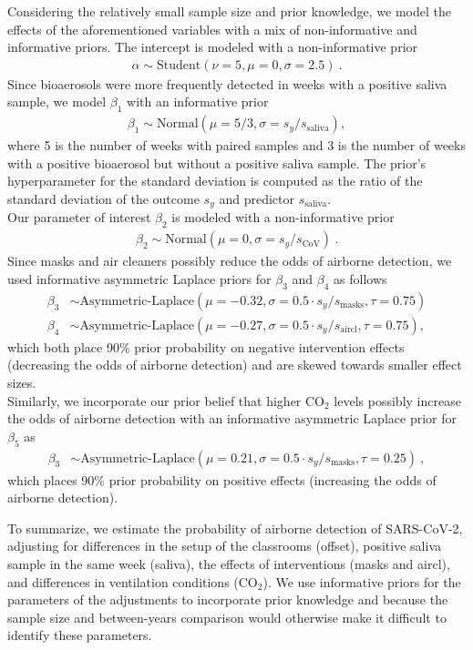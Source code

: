 \documentclass[fleqn,11pt]{wlscirep_supp}
\begin{document}
Considering the relatively small sample size and prior knowledge, we model the effects of the aforementioned variables with a mix of  non-informative and informative priors. The intercept is modeled with a non-informative prior
\begin{align}
    \alpha \sim \text{Student}(\nu=5, \mu = 0, \sigma = 2.5) ~.
\end{align}
Since bioaerosols were more frequently detected in weeks with a positive saliva sample, we model $\beta_1$ with an informative prior
\begin{align}
    \beta_1 \sim \text{Normal}(\mu = 5/3, \sigma = s_y / s_{\text{saliva}}),
\end{align}
where 5 is the number of weeks with paired samples and 3 is the number of weeks with a positive bioaerosol but without a positive saliva sample. The prior's hyperparameter for the standard deviation is computed as the ratio of the standard deviation of the outcome $s_y$ and predictor $s_{\text{saliva}}$. \\
Our parameter of interest $\beta_2$ is modeled with a non-informative prior
\begin{align}
    \beta_2 \sim \text{Normal}(\mu = 0, \sigma = s_y / s_\text{CoV})~.
\end{align}
Since masks and air cleaners possibly reduce the odds of airborne detection, we used informative asymmetric Laplace priors for $\beta_3$ and $\beta_4$ as follows
\begin{align}
    \beta_3 &\sim \text{Asymmetric-Laplace}(\mu = -0.32, \sigma = 0.5\cdot s_y / s_{\text{masks}}, \tau = 0.75) \\
    \beta_4 &\sim \text{Asymmetric-Laplace}(\mu = -0.27, \sigma = 0.5\cdot s_y / s_{\text{aircl}}, \tau = 0.75),
\end{align}
which both place 90\% prior probability on negative intervention effects (decreasing the odds of airborne detection) and are skewed towards smaller effect sizes. \\
Similarly, we incorporate our prior belief that higher CO$_2$ levels possibly increase the odds of airborne detection with an informative asymmetric Laplace prior for $\beta_5$ as
\begin{align}
    \beta_3 &\sim \text{Asymmetric-Laplace}(\mu = 0.21, \sigma = 0.5\cdot s_y / s_{\text{masks}}, \tau = 0.25)~,
\end{align}
which places 90\% prior probability on positive effects (increasing the odds of airborne detection).

To summarize, we estimate the probability of airborne detection of SARS-CoV-2, adjusting for differences in the setup of the classrooms (offset), positive saliva sample in the same week (saliva), the effects of interventions (masks and aircl), and differences in ventilation conditions (CO$_2$). We use informative priors for the parameters of the adjustments to incorporate prior knowledge and because the sample size and between-years comparison would otherwise make it difficult to identify these parameters. 

\clearpage
\end{document}
